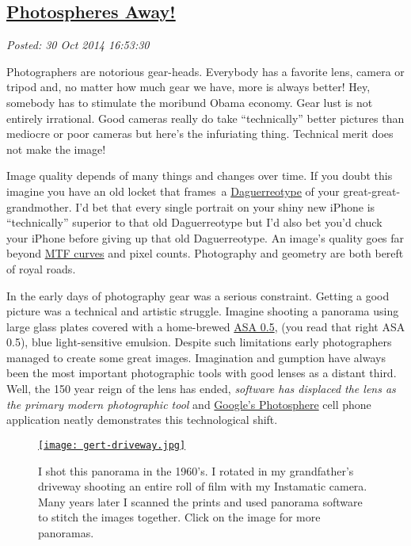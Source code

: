 %

\subsection*{\href{http://bakerjd99.wordpress.com/2014/10/30/photospheres-away-2/}{Photospheres Away!}}


\noindent\emph{Posted: 30 Oct 2014 16:53:30}
\vspace{6pt}

Photographers are notorious gear-heads. Everybody has a favorite lens,
camera or tripod and, no matter how much gear we have, more is always
better! Hey, somebody has to stimulate the moribund Obama economy. Gear
lust is not entirely irrational. Good cameras really do take
``technically'' better pictures than mediocre or poor cameras but here's
the infuriating thing. Technical merit does not make the image!

Image quality depends of many things and changes over time. If you doubt
this imagine you have an old locket that frames~a
\href{https://en.wikipedia.org/wiki/Daguerreotype}{Daguerreotype} of
your great-great-grandmother. I'd bet that every single portrait on your
shiny new iPhone is ``technically'' superior to that old Daguerreotype
but I'd also bet you'd chuck your iPhone before giving up that old
Daguerreotype. An image's quality goes far beyond
\href{http://photographylife.com/how-to-read-mtf-charts}{MTF curves} and
pixel counts. Photography and geometry are both bereft of royal roads.

In the early days of photography gear was a serious constraint. Getting
a good picture was a technical and artistic struggle. Imagine shooting a
panorama using large glass plates covered with a home-brewed
\href{http://www.alternativephotography.com/wp/processes/gelatin-silver/silver-gelatin-dry-plate-process}{ASA
0.5}, (you read that right ASA 0.5), blue light-sensitive emulsion.
Despite such limitations early photographers managed to create some
great images. Imagination and gumption have always been the most
important photographic tools with good lenses as a distant third. Well,
the 150 year reign of the lens has ended, \emph{software has displaced
the lens as the primary modern photographic tool} and
\href{https://itunes.apple.com/us/app/photo-sphere-camera/id904418768}{Google's
Photosphere} cell phone application neatly demonstrates this
technological shift.

\captionsetup[figure]{labelformat=empty}
\begin{figure}[htbp]
\centering
\href{http://conceptcontrol.smugmug.com/Themes/Manipulations/Panoramas-1}{\texttt{[image: gert-driveway.jpg]}}
\caption{I shot this panorama in the 1960's. I rotated in my grandfather's
driveway shooting an entire roll of film with my Instamatic camera. Many
years later I scanned the prints and used panorama software to stitch
the images together. Click on the image for more
panoramas.}
\label{fig:4832X0}
\end{figure}


